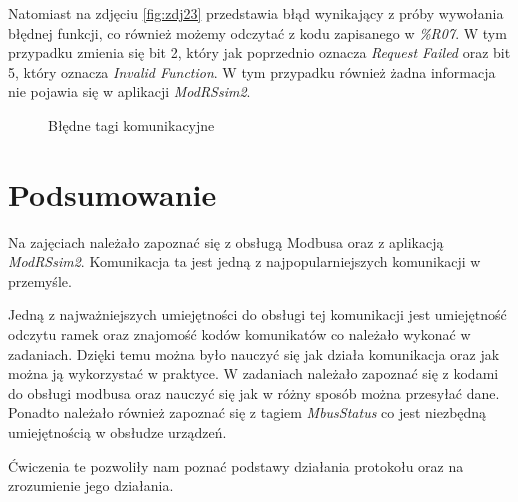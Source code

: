 \documentclass{article}
\begin{document}
Natomiast na zdjęciu \ref{fig:zdj23} przedstawia błąd wynikający z próby wywołania błędnej funkcji, co również możemy odczytać z kodu zapisanego w \textit{\%R07}. W tym przypadku zmienia się bit 2, który jak poprzednio oznacza \textit{Request Failed} oraz bit 5, który oznacza \textit{Invalid Function}. W tym przypadku również żadna informacja nie pojawia się w aplikacji \textit{ModRSsim2}.



\begin{figure}[!ht]
    \centering
    \caption{Błędne tagi komunikacyjne}
    \label{fig:main2}
\end{figure}
\newpage
\section{Podsumowanie}
Na zajęciach należało zapoznać się z obsługą Modbusa oraz z aplikacją \textit{ModRSsim2}. Komunikacja ta jest jedną z najpopularniejszych komunikacji w przemyśle.

Jedną z najważniejszych umiejętności do obsługi tej komunikacji jest umiejętność odczytu ramek oraz znajomość kodów komunikatów co należało wykonać w zadaniach. Dzięki temu można było nauczyć się jak działa komunikacja oraz jak można ją wykorzystać w praktyce. W zadaniach należało zapoznać się z kodami do obsługi modbusa oraz nauczyć się jak w różny sposób można przesyłać dane. Ponadto należało również zapoznać się z tagiem \textit{MbusStatus} co jest niezbędną umiejętnością w obsłudze urządzeń.

Ćwiczenia te pozwoliły nam poznać podstawy działania protokołu oraz na zrozumienie jego działania.
\end{document}
